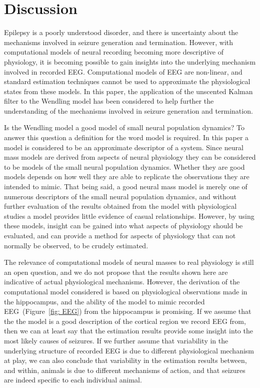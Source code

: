 \section{Discussion}

Epilepsy is a poorly understood disorder, and there is uncertainty about the mechanisms involved in seizure generation and termination. However, with computational models of neural recording becoming more descriptive of physiology, it is becoming possible to gain insights into the underlying mechanism involved in recorded EEG. Computational models of EEG are non-linear, and standard estimation techniques cannot be used to approximate the physiological states from these models. In this paper, the application of the unscented Kalman filter to the Wendling model has been considered to help further the understanding of the mechanisms involved in seizure generation and termination.


Is the Wendling model a good model of small neural population dynamics? To answer this question a definition for the word model is required. In this paper a model is considered to be an approximate descriptor of a system. Since neural mass models are derived from aspects of neural physiology they can be considered to be models of the small neural population dynamics. Whether they are good models depends on how well they are able to replicate the observations they are intended to mimic. That being said, a good neural mass model is merely one of numerous descriptors of the small neural population dynamics, and without further evaluation of the results obtained from the model with physiological studies a model provides little evidence of casual relationships. However, by using these models, insight can be gained into what aspects of physiology should be evaluated, and can provide a method for aspects of physiology that can not normally be observed, to be crudely estimated.  

The relevance of computational models of neural masses to real physiology is still an open question, and we do not propose that the results shown here are indicative of actual physiological mechanisms. However, the derivation of the computational model considered is based on physiological observations made in the hippocampus\citep{freeman1963electrical,wilson1973mathematical,white2000networks}, and the ability of the model to mimic recorded EEG~(Figure~\ref{fig: EEG}) from the hippocampus is promising. If we assume that the the model is a good description of the cortical region we record EEG from, then we can at least say that the estimation results provide some insight into the most likely causes of seizures. If we further assume that variability in the underlying structure of recorded EEG is due to different physiological mechanism at play, we can also conclude that variability in the estimation results between, and within, animals is due to different mechanisms of action, and that seizures are indeed specific to each individual animal.

